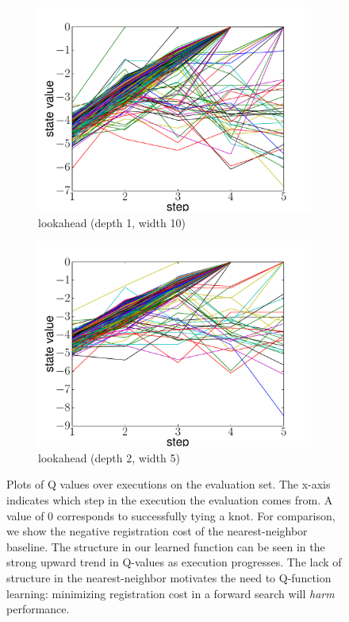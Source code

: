 \begin{figure}
\begin{subfigure}[b]{0.48\linewidth}
    \includegraphics[width=\textwidth]{figures/state_value_lookahead1-10.pdf}
    \caption{lookahead (depth 1, width 10)}
    \label{fig:value_lookahead_1}
  \end{subfigure}
  \begin{subfigure}[b]{0.48\linewidth}
    \includegraphics[width=\textwidth]{figures/state_value_lookahead2-5.pdf}
    \caption{lookahead (depth 2, width 5)}
    \label{fig:value_lookahead_2}
  \end{subfigure}
  \caption{Plots of Q values over executions on the evaluation set. The x-axis indicates which step in the execution
           the evaluation comes from. A value of 0 corresponds to successfully tying a knot. For comparison, we show the 
           negative registration cost of the nearest-neighbor baseline. The structure in our learned function can be seen
           in the strong upward trend in Q-values as execution progresses. The lack of structure in the nearest-neighbor
           motivates the need to Q-function learning: minimizing registration cost in a forward search will \emph{harm} performance.}
\end{figure}

